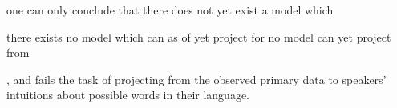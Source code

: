 one can only conclude that
there does not yet exist a model which 

 there exists no model which can as of yet project for no model can yet project from 


, and fails the task of projecting from the observed primary data to speakers' intuitions about possible words in their language. 

